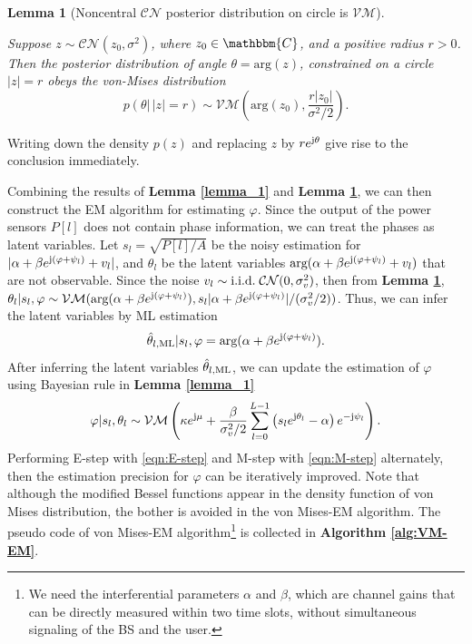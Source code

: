 \documentclass[12pt,draftclsnofoot,journal,onecolumn]{IEEEtran}
\newtheorem{lemma}{\bf Lemma}
\theoremstyle{nonumberplain}
\def \arg {\text{arg}}
\def \CN {\mathcal{CN}}
\def \VM {\mathcal{VM}}
\begin{document}
    \begin{lemma}[Noncentral $\CN$ posterior distribution on circle is $\VM$]\label{lemma_2} \mbox{}\par
        Suppose $z \sim \CN(z_0, \sigma^2)$, where $z_0 \in \mathbbm{C}$, and a positive radius $r>0$. Then the posterior distribution of angle $\theta= \arg (z)$, constrained on a circle $|z|=r$ obeys the von-Mises distribution
        \begin{equation}
            p(\theta |\, |z|=r) \sim \VM\left(\arg(z_0), \frac{r|z_0|}{\sigma^2/2}\right).
        \end{equation}
    \end{lemma}
    \begin{IEEEproof}
        Writing down the density $p(z)$ and replacing $z$ by $r e^{{\rm j} \theta}$ give rise to the conclusion immediately. 
    \end{IEEEproof}
    Combining the results of {\bf Lemma \ref{lemma_1}} and {\bf Lemma \ref{lemma_2}}, we can then construct the EM algorithm for estimating $\varphi$. Since the output of the power sensors $P[l]$ does not contain phase information, we can treat the phases as latent variables. Let $s_l = \sqrt{P[l]/A}$ be the noisy estimation for $|\alpha + \beta e^{{\rm j} (\varphi + \psi_l)} + v_l|$, and $\theta_l$ be the latent variables $\arg (\alpha + \beta e^{{\rm j} (\varphi + \psi_l)} + v_l)$ that are not observable. 
    Since the noise $v_l \sim {\rm i.i.d.}\;\CN(0, \sigma_v^2)$, then from {\bf Lemma \ref{lemma_2}}, $\theta_l | s_l, \varphi \sim \VM(\arg(\alpha + \beta e^{{\rm j} (\varphi + \psi_l)}), s_l |\alpha + \beta e^{{\rm j} (\varphi + \psi_l)}|/(\sigma_v^2/2))$. Thus, we can infer the latent variables by ML estimation 
    \begin{equation}
        \hat{\theta}_{l, {\rm ML}} | s_l, \varphi = \arg(\alpha + \beta e^{{\rm j} (\varphi + \psi_l)}).
        \label{eqn:E-step}
    \end{equation}
    After inferring the latent variables $\hat{\theta}_{l, {\rm ML}}$, we can update the estimation of $\varphi$ using Bayesian rule in {\bf Lemma \ref{lemma_1}}
    \begin{equation}
        \varphi | s_l, \theta_l \sim \VM\left( \kappa e^{{\rm j} \mu} + \frac{\beta}{\sigma_v^2/2}\sum_{l=0}^{L-1}{\left(s_l e^{{\rm j}\theta_l}-\alpha\right)e^{-{\rm j} \psi_l}}\right).
        \label{eqn:M-step}
    \end{equation}
    Performing E-step with \eqref{eqn:E-step} and M-step with \eqref{eqn:M-step} alternately, then the estimation precision for $\varphi$ can be iteratively improved. Note that although the modified Bessel functions appear in the density function of von Mises distribution, the bother is avoided in the von Mises-EM algorithm. The pseudo code of von Mises-EM algorithm\footnote{We need the interferential parameters $\alpha$ and $\beta$, which are channel gains that can be directly measured within two time slots, without simultaneous signaling of the BS and the user. } is collected in {\bf Algorithm \ref{alg:VM-EM}}.
\end{document}

